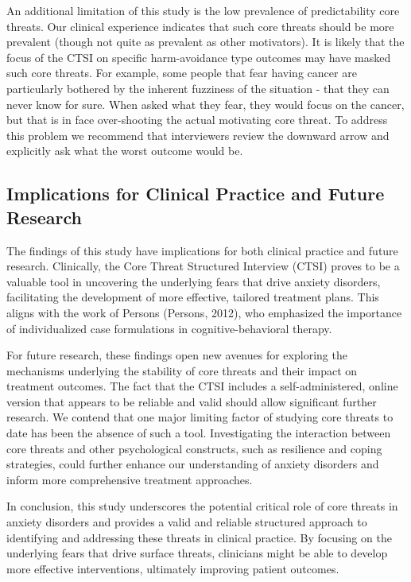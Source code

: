 \documentclass[
  man,floatsintext]{apa7}
\begin{document}
An additional limitation of this study is the low prevalence of predictability core threats.
Our clinical experience indicates that such core threats should be more prevalent (though not quite as prevalent as other motivators).
It is likely that the focus of the CTSI on specific harm-avoidance type outcomes may have masked such core threats.
For example, some people that fear having cancer are particularly bothered by the inherent fuzziness of the situation - that they can never know for sure.
When asked what they fear, they would focus on the cancer, but that is in face over-shooting the actual motivating core threat.
To address this problem we recommend that interviewers review the downward arrow and explicitly ask what the worst outcome would be.

\subsection{Implications for Clinical Practice and Future Research}\label{implications-for-clinical-practice-and-future-research}

The findings of this study have implications for both clinical practice and future research.
Clinically, the Core Threat Structured Interview (CTSI) proves to be a valuable tool in uncovering the underlying fears that drive anxiety disorders, facilitating the development of more effective, tailored treatment plans.
This aligns with the work of Persons (Persons, 2012), who emphasized the importance of individualized case formulations in cognitive-behavioral therapy.

For future research, these findings open new avenues for exploring the mechanisms underlying the stability of core threats and their impact on treatment outcomes.
The fact that the CTSI includes a self-administered, online version that appears to be reliable and valid should allow significant further research.
We contend that one major limiting factor of studying core threats to date has been the absence of such a tool.
Investigating the interaction between core threats and other psychological constructs, such as resilience and coping strategies, could further enhance our understanding of anxiety disorders and inform more comprehensive treatment approaches.

In conclusion, this study underscores the potential critical role of core threats in anxiety disorders and provides a valid and reliable structured approach to identifying and addressing these threats in clinical practice.
By focusing on the underlying fears that drive surface threats, clinicians might be able to develop more effective interventions, ultimately improving patient outcomes.
\end{document}

